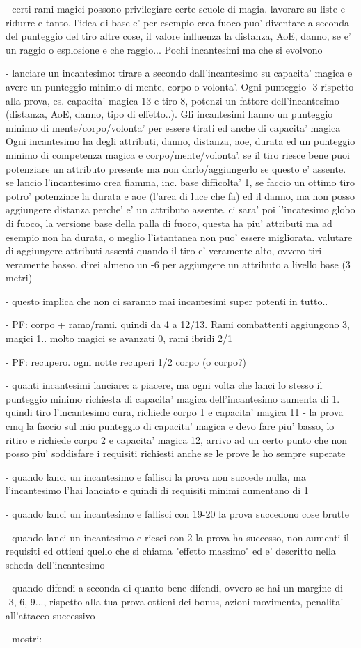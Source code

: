 \documentclass[12pt,a4paper,twoside,openany,twocolumn]{book}
\begin{document}
- certi rami magici possono privilegiare certe scuole di magia. lavorare su liste e ridurre e tanto. l'idea di base e' per esempio crea fuoco puo' diventare a seconda del punteggio del tiro altre cose, il valore influenza la distanza, AoE, danno, se e' un raggio o esplosione e che raggio...  Pochi incantesimi ma che si evolvono

- lanciare un incantesimo: tirare a secondo dall'incantesimo su capacita' magica e avere un punteggio minimo di  mente, corpo o volonta'.  Ogni punteggio -3 rispetto alla prova, es. capacita' magica 13 e tiro 8, potenzi un fattore dell'incantesimo (distanza, AoE, danno, tipo di effetto..). Gli incantesimi hanno un punteggio minimo di mente/corpo/volonta' per essere tirati ed anche di capacita' magica
Ogni incantesimo ha degli attributi, danno, distanza, aoe, durata ed un punteggio minimo di competenza magica e corpo/mente/volonta'. se il tiro riesce bene puoi potenziare un attributo presente ma non darlo/aggiungerlo se questo e' assente. se lancio l'incantesimo crea fiamma, inc. base difficolta' 1, se faccio un ottimo tiro potro' potenziare la durata e aoe (l'area di luce che fa) ed il danno, ma non posso aggiungere distanza perche' e' un attributo assente.
ci sara' poi l'incatesimo globo di fuoco, la versione base della palla di fuoco, questa ha piu' attributi ma ad esempio non ha durata, o meglio l'istantanea non puo' essere migliorata.
valutare di aggiungere attributi assenti quando il tiro e' veramente alto, ovvero tiri veramente basso, direi almeno un -6 per aggiungere un attributo a livello base (3 metri)

- questo implica che non ci saranno mai incantesimi super potenti in tutto..

- PF: corpo + ramo/rami. quindi da 4 a 12/13. Rami combattenti aggiungono 3, 
magici 1.. molto magici se avanzati 0, rami ibridi 2/1

- PF: recupero. ogni notte recuperi 1/2 corpo (o corpo?)

- quanti incantesimi lanciare:  a piacere, ma ogni volta che lanci lo stesso il punteggio minimo richiesta di capacita' magica dell'incantesimo aumenta di 1. quindi tiro l'incantesimo cura, richiede corpo 1 e capacita' magica 11 - la prova cmq la faccio sul mio punteggio di capacita' magica e devo fare piu' basso, lo ritiro e richiede corpo 2 e capacita' magica 12, arrivo ad un certo punto che non posso piu' soddisfare i requisiti richiesti anche se le prove le ho sempre superate

- quando lanci un incantesimo e fallisci la prova non succede nulla, ma l'incantesimo l'hai lanciato e quindi di requisiti minimi aumentano di 1

- quando lanci un incantesimo e fallisci con 19-20 la prova succedono cose  brutte

- quando lanci un incantesimo e riesci con 2 la prova ha successo, non aumenti il requisiti ed ottieni quello che si chiama "effetto massimo" ed e' descritto nella scheda dell'incantesimo

- quando difendi  a seconda di quanto bene difendi, ovvero se hai un margine di -3,-6,-9..., rispetto alla tua prova ottieni dei bonus, azioni movimento, penalita' all'attacco successivo

- mostri:
\end{document}
